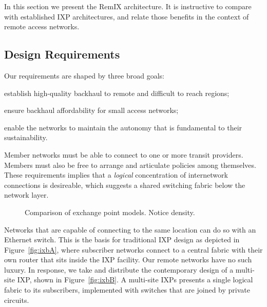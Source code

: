 In this section we present the RemIX architecture. It is instructive
to compare with established IXP architectures, and relate those
benefits in the context of remote access networks.

\subsection{Design Requirements}

Our requirements are shaped by three broad goals:
\begin{inparaenum}[(i)]
  \item establish high-quality backhaul to remote and difficult to
    reach regions;
  \item ensure backhaul affordability for small access networks;
  \item enable the networks to maintain the autonomy that is
    fundamental to their sustainability.
\end{inparaenum}
Member networks must be able to connect to one or more transit providers.
Members must also be free to arrange and articulate policies among themselves.
These requirements implies that a \emph{logical} concentration of internetwork
connections is desireable, which suggests a shared switching fabric below the
network layer.

\begin{figure*}
   \hfill
   \hfill
  \subfloat[RemIX]{
    \resizebox{0.6\columnwidth}{!}{
      \begin{tikzpicture}
        \ixboxesC
      \end{tikzpicture}
      \label{fig:ixbC}
    }
  }
  \caption{Comparison of exchange point models. Notice density.}
  \label{fig:ixb}
\end{figure*}

Networks that are capable of connecting to the same location can do so with an
Ethernet switch. This is the basis for traditional \ac{IXP} design as depicted
in Figure~\ref{fig:ixbA}, where subscriber networks connect to a central fabric
with their own router that sits inside the IXP facility. Our remote networks
have no such luxury. In response, we take and distribute the contemporary design
of a multi-site \ac{IXP}, shown in Figure~\ref{fig:ixbB}. A multi-site \acp{IXP}
presents a single logical fabric to its subscribers, implemented with switches
that are joined by private circuits.

